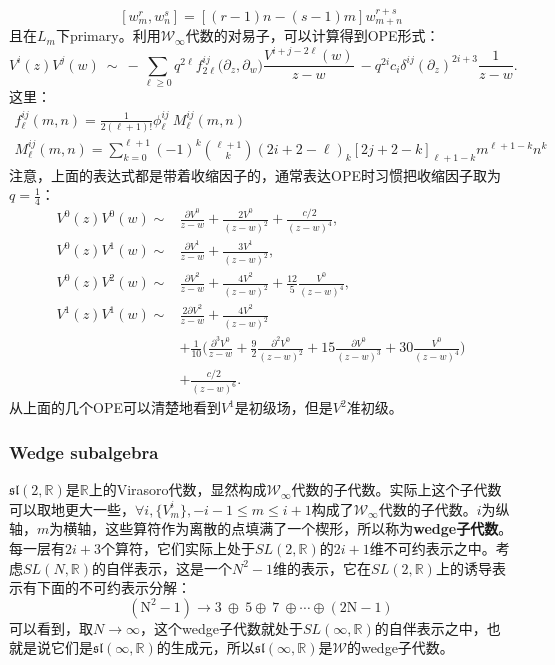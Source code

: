 \begin{equation}
	\boxed{
		[w_m^r,w_n^s]=\left[(r-1)n-(s-1)m\right]w_{m+n}^{r+s}
	}
\end{equation}
且在$L_m$下primary。利用$\mathcal{W}_\infty$代数的对易子，可以计算得到OPE形式：
\begin{equation}
	V^i(z)V^j(w)~\sim~-\sum_{\ell\geq0}q^{2\ell}f_{2\ell}^{ij}\bigl(\partial_z,\partial_w\bigr)\frac{V^{i+j-2\ell}(w)}{z-w}~-q^{2i}c_i\delta^{ij}(\partial_z)^{2i+3}\frac{1}{z-w}.
\end{equation}
这里：
\begin{equation}
	\begin{gathered}
		f_{\ell}^{ij}(m,n)=\frac1{2(\ell+1)!}\phi_{\ell}^{ij}~M_{\ell}^{ij}(m,n)\\
		M_\ell^{ij}(m,n)=\sum_{k=0}^{\ell+1}(-1)^k\binom{\ell+1}k(2i+2-\ell)_k[2j+2-k]_{\ell+1-k}m^{\ell+1-k}n^k
	\end{gathered}
\end{equation}
注意，上面的表达式都是带着收缩因子的，通常表达OPE时习惯把收缩因子取为$q=\frac14$：
\begin{equation}\label{eq:41.38}
	\begin{aligned}
		V^0(z)V^0(w) \sim&\frac{\partial V^0}{z-w}+\frac{2V^0}{(z-w)^2}+\frac{c/2}{(z-w)^4}, \\
		V^0(z)V^1(w) \sim&\frac{\partial V^1}{z-w}+\frac{3V^1}{(z-w)^2},  \\
		V^0(z)V^2(w) \sim&\frac{\partial V^2}{z-w}+\frac{4V^2}{(z-w)^2}+\frac{12}5\frac{V^0}{(z-w)^4},  \\
		V^1(z)V^1(w) \sim&\frac{2\partial V^2}{z-w}+\frac{4V^2}{(z-w)^2}  \\
		&+\frac{1}{10}\Big(\frac{\partial^3V^0}{z-w}+\frac{9}{2}\frac{\partial^2V^0}{(z-w)^2}+15\frac{\partial V^0}{(z-w)^3}+30\frac{V^0}{(z-w)^4}\Big) \\
		&+\frac{c/2}{(z-w)^6}.
	\end{aligned}
\end{equation}
从上面的几个OPE可以清楚地看到$V^1$是初级场，但是$V^2$准初级。
\subsubsection{Wedge subalgebra}
$\mathfrak{sl}(2,\mathbb{R})$是$\mathbb{R}$上的Virasoro代数，显然构成$\mathcal{W}_\infty$代数的子代数。实际上这个子代数可以取地更大一些，$\forall i ,\{V_{m}^i\},-i-1\leq m\leq i+1$构成了$\mathcal{W}_\infty$代数的子代数。$i$为纵轴，$m$为横轴，这些算符作为离散的点填满了一个楔形，所以称为\textbf{wedge子代数}。每一层有$2i+3$个算符，它们实际上处于$SL(2,\mathbb{R})$的$2i+1$维不可约表示之中。考虑$SL(N,\mathbb{R})$的自伴表示，这是一个$N^2-1$维的表示，它在$SL(2,\mathbb{R})$上的诱导表示有下面的不可约表示分解：
\begin{equation}
	\mathrm{(N^2-1)\longrightarrow3~\oplus~5\oplus~7~\oplus\cdots\oplus(2N-1)}
\end{equation}
可以看到，取$N\to\infty$，这个wedge子代数就处于$SL(\infty,\mathbb{R})$的自伴表示之中，也就是说它们是$\mathfrak{sl}(\infty,\mathbb{R})$的生成元，所以$\mathfrak{sl}(\infty,\mathbb{R})$是$\mathcal{W}$的wedge子代数。

